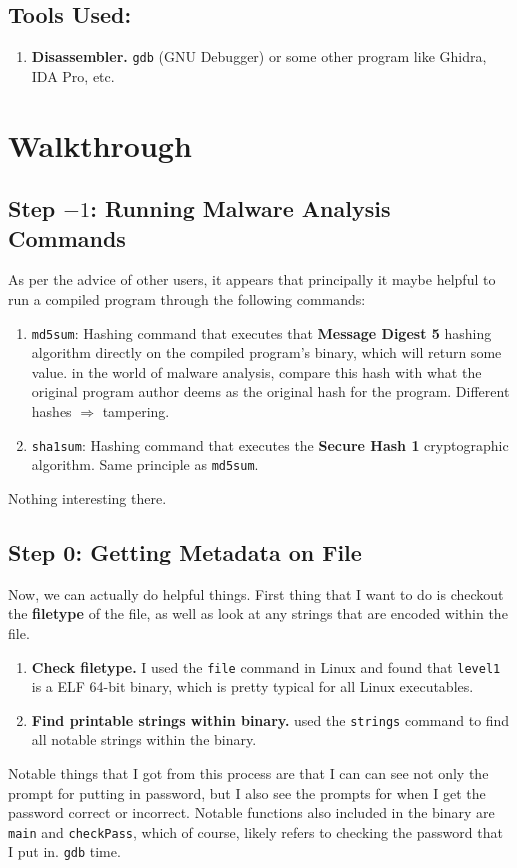 \documentclass{report}
\begin{document}
\begin{sloppypar}
  \subsection{Tools Used:}%
  \label{subsec:label}
  \begin{enumerate}
    \item \textbf{Disassembler.} \texttt{gdb} (GNU Debugger) or some other program like Ghidra, IDA Pro, etc.
  \end{enumerate}
  \section{Walkthrough}%
  \label{sec:Walkthrough}
  \subsection{Step $-1$: Running Malware Analysis Commands}%
  \label{subsec:Step0}
  As per the advice of other users, it appears that principally it maybe helpful to run a compiled program through the following commands:
  \begin{enumerate}
    \item \texttt{md5sum}: Hashing command that executes that
          \textbf{Message Digest 5} hashing algorithm directly
          on the compiled program's binary, which will return some value. in
          the world of malware analysis, compare this hash with what
          the original program author deems as the original hash
          for the program. Different hashes $\Rightarrow$ tampering.
    \item \texttt{sha1sum}: Hashing command that executes the \textbf{Secure
          Hash 1} cryptographic algorithm. Same principle as \texttt{md5sum}.
  \end{enumerate}
  Nothing interesting there.

  \subsection{Step 0: Getting Metadata on File}%
  \label{subsec:label}
  Now, we can actually do helpful things. First thing that I want to do is
  checkout the \textbf{filetype} of the file, as well as look at any
  strings that are encoded within the file.
  \begin{enumerate}
    \item \textbf{Check filetype.} I used the \texttt{file} command in Linux
          and found that \texttt{level1} is a ELF 64-bit
          binary, which is pretty typical for all Linux
          executables.
    \item \textbf{Find printable strings within binary.} used the \texttt{strings} command to find all notable strings within the binary.
  \end{enumerate}
  Notable things that I got from this process are that
  I can can see not only the prompt for putting in password, but I also
  see the prompts for when I get the password correct or incorrect. Notable
  functions also included in the binary are \texttt{main}  and \texttt{checkPass}, which of course, likely refers to checking the password
  that I put in. \texttt{gdb} time.


\end{sloppypar}
\end{document}
